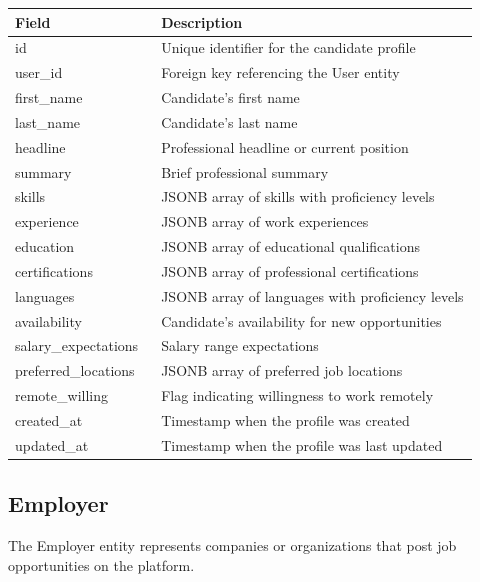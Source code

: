 \documentclass[12pt,a4paper]{report}
\begin{document}
\begin{longtable}{p{0.28\linewidth} p{0.64\linewidth}}
\toprule
\textbf{Field} & \textbf{Description}\\
\midrule
id & Unique identifier for the candidate profile\\
user\_id & Foreign key referencing the User entity\\
first\_name & Candidate's first name\\
last\_name & Candidate's last name\\
headline & Professional headline or current position\\
summary & Brief professional summary\\
skills & JSONB array of skills with proficiency levels\\
experience & JSONB array of work experiences\\
education & JSONB array of educational qualifications\\
certifications & JSONB array of professional certifications\\
languages & JSONB array of languages with proficiency levels\\
availability & Candidate's availability for new opportunities\\
salary\_expectations & Salary range expectations\\
preferred\_locations & JSONB array of preferred job locations\\
remote\_willing & Flag indicating willingness to work remotely\\
created\_at & Timestamp when the profile was created\\
updated\_at & Timestamp when the profile was last updated\\
\bottomrule
\end{longtable}

\subsection{Employer}
The Employer entity represents companies or organizations that post job opportunities on the platform.
\end{document}
